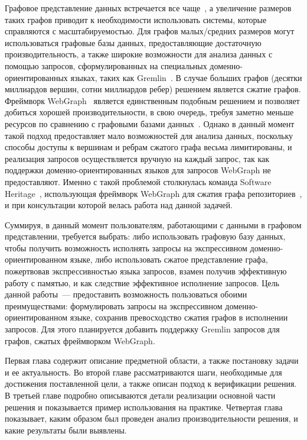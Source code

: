 \documentclass[times,specification,annotation]{itmo-student-thesis}
\begin{document}
Графовое представление данных встречается все чаще~\cite{big-graphs-future-arxiv}, а увеличение размеров таких графов приводит к необходимости использовать системы, которые справляются с масштабируемостью. Для графов малых/средних размеров могут использоваться графовые базы данных, предоставляющие достаточную производительность, а также широкие возможности для анализа данных с помощью запросов, сформулированных на специальных доменно-ориентированных языках, таких как Gremlin~\cite{gremlin}. В случае больших графов (десятки миллиардов вершин, сотни миллиардов ребер) решением является сжатие графов. Фреймворк WebGraph~\cite{webgraph} является единственным подобным решением и позволяет добиться хорошей производительности, в свою очередь,  требуя заметно меньше ресурсов по сравнению с графовыми базами данных~\cite{graph-db-scale, scale-cost, swh-antoine, saner}. Однако в данный момент такой подход предоставляет мало возможностей для анализа данных, поскольку способы доступы к вершинам и ребрам сжатого графа весьма лимитированы, и реализация запросов осуществляется вручную на каждый запрос, так как поддержки доменно-ориентированных языков для запросов WebGraph не предоставляют. Именно с такой проблемой столкнулась команда Software Heritage~\cite{swh-main-page, swh-intern}, использующая фреймворк WebGraph для сжатия графа репозиториев~\cite{saner}, и при консультации которой велась работа над данной задачей.

Суммируя, в данный момент пользователям, работающими с данными в графовом представлении, требуется выбрать: либо использовать графовую базу данных, чтобы получить возможность исполнять запросы на экспрессивном доменно-ориентированном языке, либо использовать сжатое представление графа, пожертвовав экспрессивностью языка запросов, взамен получив эффективную работу с памятью, и как следствие эффективное исполнение запросов.
Цель данной работы~--- предоставить возможность пользоваться обоими преимуществами: формулировать запросы на экспрессивном доменно-ориентированном языке, сохранив превосходство сжатия графов в исполнении запросов. Для этого планируется добавить поддержку Gremlin запросов для графов, сжатых фреймворком WebGraph.

Первая глава содержит описание предметной области, а также постановку задачи и ее актуальность. Во второй главе рассматриваются шаги, необходимые для достижения поставленной цели, а также описан подход к верификации решения. В третьей главе подробно описываются детали реализации основной части решения и показывается пример использования на практике. Четвертая глава показывает, каким образом был проведен анализ производительности решения, и какие результаты были выявлены.
\end{document}
